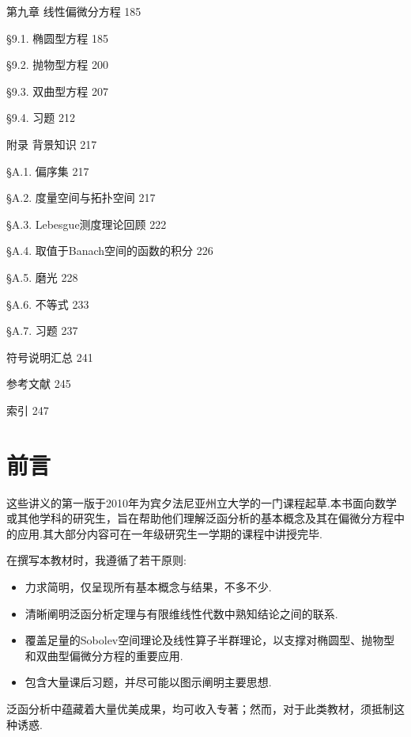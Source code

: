 \documentclass[10pt,b5paper,openany,twoside]{ctexbook}
\begin{document}
第九章 线性偏微分方程 185

§9.1. 椭圆型方程 185

§9.2. 抛物型方程 200

§9.3. 双曲型方程 207

§9.4. 习题 212

附录 背景知识 217

§A.1. 偏序集 217

§A.2. 度量空间与拓扑空间 217

§A.3. Lebesgue测度理论回顾 222

§A.4. 取值于Banach空间的函数的积分 226

§A.5. 磨光 228

§A.6. 不等式 233

§A.7. 习题 237

符号说明汇总 241

参考文献 245

索引 247

\section*{前言}

这些讲义的第一版于2010年为宾夕法尼亚州立大学的一门课程起草.本书面向数学或其他学科的研究生，旨在帮助他们理解泛函分析的基本概念及其在偏微分方程中的应用.其大部分内容可在一年级研究生一学期的课程中讲授完毕.

在撰写本教材时，我遵循了若干原则:

\begin{itemize}\relax
\item\relax 力求简明，仅呈现所有基本概念与结果，不多不少.
\end{itemize}

\begin{itemize}\relax
\item\relax 清晰阐明泛函分析定理与有限维线性代数中熟知结论之间的联系.
\end{itemize}

\begin{itemize}\relax
\item\relax 覆盖足量的Sobolev空间理论及线性算子半群理论，以支撑对椭圆型、抛物型和双曲型偏微分方程的重要应用.
\end{itemize}

\begin{itemize}\relax
\item\relax 包含大量课后习题，并尽可能以图示阐明主要思想.
\end{itemize}

泛函分析中蕴藏着大量优美成果，均可收入专著；然而，对于此类教材，须抵制这种诱惑.
\end{document}
